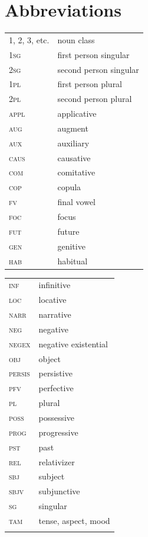 \documentclass[output=paper,colorlinks,citecolor=brown,draftmode]{langscibook}
\begin{document}
\newpage
\section*{Abbreviations}
\begin{tabularx}{.45\textwidth}{lQ}
1, 2, 3, etc.& noun class\\
1\textsc{sg} & first person singular\\ 
2\textsc{sg} & second person singular\\
1\textsc{pl} & first person plural\\
2\textsc{pl} & second person plural\\
\textsc{appl} & applicative\\
\textsc{aug} & augment\\
\textsc{aux} & auxiliary\\
\textsc{caus} & causative\\
\textsc{com} & comitative\\
\textsc{cop} & copula\\
\textsc{fv} & final vowel\\
\textsc{foc} & focus\\
\textsc{fut} & future\\
\textsc{gen} & genitive\\
\textsc{hab} & habitual\\
\end{tabularx}
\begin{tabularx}{.45\textwidth}{lQ}
\textsc{inf} & infinitive\\
\textsc{loc} & locative\\
\textsc{narr} & narrative\\
\textsc{neg} & negative\\
\textsc{negex} & negative existential\\
\textsc{obj} & object\\
\textsc{persis} & persistive\\
\textsc{pfv} & perfective\\
\textsc{pl} & plural\\
\textsc{poss} & possessive\\
\textsc{prog} & progressive\\
\textsc{pst} & past\\
\textsc{rel} & relativizer\\
\textsc{sbj} & subject\\
\textsc{sbjv} & subjunctive\\
\textsc{sg} & singular\\
\textsc{tam} & tense, aspect, mood\\
\\
\end{tabularx}



\printbibliography[heading=subbibliography,notkeyword=this]
\end{document}
